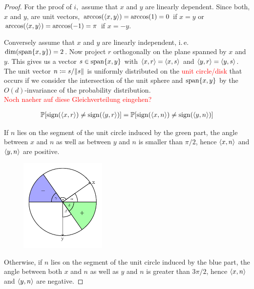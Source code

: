 	\begin{proof}
		For the proof of $i,$ assume that $x$ and $y$ are linearly dependent. Since both, $x$ and $y$, are unit vectors, $\arccos(\langle{x},{y}\rangle) = \arccos(1)=0$ if $x=y$ or $\arccos(\langle{x},{y}\rangle) = \arccos(-1) = \pi$ if $x=-y$.
		
		Conversely assume that $x$ and $y$ are linearly independent, i.\,e. $\operatorname{dim}(\operatorname{span}\{x,y\})=2$. Now project $r$ orthogonally on the plane spanned by $x$ and $y$. This gives us a vector $s\in \operatorname{span}\{x,y\}$ with $\langle{x},{r}\rangle = \langle{x},{s}\rangle$ and $\langle{y},{r}\rangle = \langle{y},{s}\rangle$. The unit vector $n\coloneqq s/ \Vert {s} \Vert$ is uniformly distributed on the \textcolor{red}{unit circle/disk} that occurs if we consider the intersection of the unit sphere and $\operatorname{span}\{x,y\}$ by the $O(d)$-invariance of the probability distribution. \\
		
		\textcolor{red}{Noch naeher auf diese Gleichverteilung eingehen?}
		
		\begin{align*}
			\mathbb{P}[\operatorname{sign}(\langle{x},{r}\rangle)\neq\operatorname{sign}(\langle{y},{r}\rangle)]= \mathbb{P}[\operatorname{sign}(\langle{x},{n}\rangle)\neq\operatorname{sign}(\langle{y},{n}\rangle)] 
		\end{align*} 
		
		\noindent\begin{minipage}{\textwidth}	
			If $n$ lies on the segment of the unit circle induced by the green part, the angle between $x$ and $n$ as well as between $y$ and $n$ is smaller than $\pi/2$, hence $\langle{x},{n}\rangle$ and $\langle{y},{n}\rangle$ are positive. 
			\begin{figure}
				\vspace{-20pt}
				\begin{center}
					\includegraphics[width=0.38\textwidth]{chapters/fig_unit_circle.pdf}
				\end{center}
				\vspace{-20pt}
			\end{figure}
			Otherwise, if $n$ lies on the segment of the unit circle induced by the blue part, the angle between both $x$ and $n$ as well as $y$ and $n$ is greater than $3\pi/2$, hence $\langle{x},{n}\rangle$ and $\langle{y},{n}\rangle$ are negative.
			

\end{minipage}
\end{proof}
